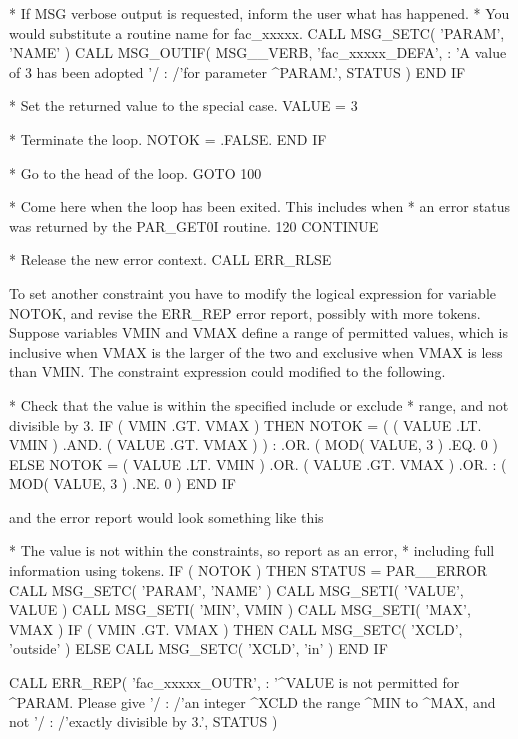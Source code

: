 \documentclass[twoside,11pt,nolof]{starlink}
\begin{document}
\begin{terminalv}
*  If MSG verbose output is requested, inform the user what has happened.
*  You would substitute a routine name for fac_xxxxx.
               CALL MSG_SETC( 'PARAM', 'NAME' )
               CALL MSG_OUTIF( MSG__VERB, 'fac_xxxxx_DEFA',
    :            'A value of 3 has been adopted '/
    :            /'for parameter ^PARAM.', STATUS )
            END IF

*  Set the returned value to the special case.
            VALUE = 3

*  Terminate the loop.
            NOTOK = .FALSE.
         END IF

*  Go to the head of the loop.
         GOTO 100

*  Come here when the loop has been exited.  This includes when
*  an error status was returned by the PAR_GET0I routine.
  120 CONTINUE

*  Release the new error context.
      CALL ERR_RLSE
\end{terminalv}

To set another constraint you have to modify the logical expression
for variable NOTOK, and revise the ERR\_REP error report, possibly
with more tokens.  Suppose variables VMIN and VMAX define a range
of permitted values, which is inclusive when VMAX is the larger of
the two and exclusive when VMAX is less than VMIN.  The constraint
expression could modified to the following.

\begin{terminalv}
*  Check that the value is within the specified include or exclude
*  range, and not divisible by 3.
      IF ( VMIN .GT. VMAX ) THEN
         NOTOK = ( ( VALUE .LT. VMIN ) .AND. ( VALUE .GT. VMAX ) )
     :           .OR. ( MOD( VALUE, 3 ) .EQ. 0 )
      ELSE
         NOTOK = ( VALUE .LT. VMIN ) .OR. ( VALUE .GT. VMAX ) .OR.
:                ( MOD( VALUE, 3 ) .NE. 0 )
      END IF
\end{terminalv}

and the error report would look something like this

\begin{terminalv}
*  The value is not within the constraints, so report as an error,
*  including full information using tokens.
            IF ( NOTOK ) THEN
               STATUS = PAR__ERROR
               CALL MSG_SETC( 'PARAM', 'NAME' )
               CALL MSG_SETI( 'VALUE', VALUE )
               CALL MSG_SETI( 'MIN', VMIN )
               CALL MSG_SETI( 'MAX', VMAX )
               IF ( VMIN .GT. VMAX ) THEN
                  CALL MSG_SETC( 'XCLD', 'outside' )
               ELSE
                  CALL MSG_SETC( 'XCLD', 'in' )
               END IF

               CALL ERR_REP( 'fac_xxxxx_OUTR',
     :           '^VALUE is not permitted for ^PARAM.  Please give '/
     :           /'an integer ^XCLD the range ^MIN to ^MAX, and not '/
     :           /'exactly divisible by 3.', STATUS )
\end{terminalv}
\end{document}
